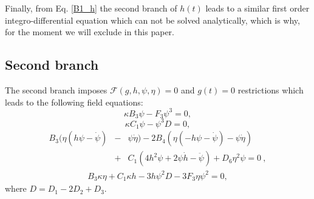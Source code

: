 \documentclass[epj]{svjour}
\begin{document}
Finally, from Eq. \eqref{B1_h} the second branch of $h(t)$ leads to a similar first order integro-differential equation 
which can not be solved analytically, which is why, for the moment we will exclude in this paper.

\subsection{Second branch}
\label{sec:second_branch}

The second branch imposes $\mathcal{F}(g,h,\psi,\eta)  = 0$ and $g(t) = 0$ restrictions which leads to the following field equations:
\begin{dmath}
    \label{Feq_B2_1}
    \kappa B_3 \psi - F_3\psi^3= 0,
\end{dmath}
\begin{dmath}
    \label{Feq_B2_3}
    \kappa C_1\psi - \psi^3 D = 0 ,
\end{dmath}
\begin{eqnarray}
    \label{Feq_B2_4}
    B_3(\eta(h\psi -\dot{\psi}) &-&\psi\dot{\eta}) - 2B_4(\eta(-h\psi - \dot{\psi}) - \psi\dot{\eta})   \\ &+& C_1(4h^2\psi + 2\psi\dot{h} -\ddot{\psi}) + D_6\eta^2\psi = 0 \ ,\nonumber 
\end{eqnarray}
\begin{eqnarray}
    \label{Feq_B2_5}
    B_3\kappa\eta + C_1\kappa h - 3h\psi^2 D - 3F_3\eta\psi^2 = 0,
\end{eqnarray}
where $D = D_1 - 2D_2 + D_3$.
\end{document}

